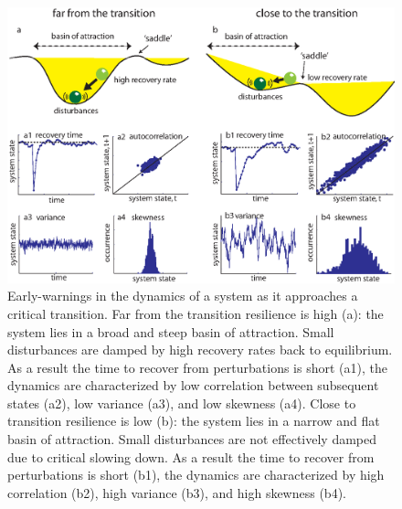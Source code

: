 \documentclass[12pt,a4paper,final]{article}
\begin{document}
\begin{figure}[h]
\begin{center}
\includegraphics[scale=0.8]{figure1.eps}
\caption{Early-warnings in the dynamics of a system as it approaches a critical transition. Far from the transition resilience is high (a): the system lies in a broad and steep basin of attraction. Small disturbances are damped by high recovery rates back to equilibrium. As a result the time to recover from perturbations is short (a1), the dynamics are characterized by low correlation between subsequent states (a2), low variance (a3), and low skewness (a4). Close to transition resilience is low (b): the system lies in a narrow and flat basin of attraction. Small disturbances are not effectively damped due to critical slowing down. As a result the time to recover from perturbations is short (b1), the dynamics are characterized by high correlation (b2), high variance (b3), and high skewness (b4).}
\end{center}
\label{fig:ews_theory}
\end{figure}
\end{document}
